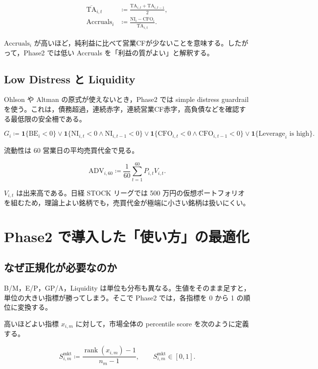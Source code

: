 \documentclass[a4paper,10pt]{article}
\newcommand{\BE}{\mathrm{BE}}
\newcommand{\NI}{\mathrm{NI}}
\newcommand{\CFO}{\mathrm{CFO}}
\newcommand{\TA}{\mathrm{TA}}
\newcommand{\ADV}{\mathrm{ADV}}
\newcommand{\Acc}{\mathrm{Accruals}}
\newcommand{\rank}{\operatorname{rank}}
\newcommand{\1}{\mathbf{1}}
\begin{document}
\begin{align}
\overline{\TA}_{i,t} &\coloneqq \frac{\TA_{i,t}+\TA_{i,t-1}}{2}, \label{eq:avgta}\\
\Acc_i &\coloneqq \frac{\NI_i-\CFO_i}{\overline{\TA}_{i,t}}. \label{eq:accruals}
\end{align}

$\Acc_i$ が高いほど，純利益に比べて営業CFが少ないことを意味する。したがって，Phase2 では低い Accruals を「利益の質がよい」と解釈する。

\subsection{Low Distress と Liquidity}
Ohlson や Altman の原式が使えないとき，Phase2 では simple distress guardrail を使う。これは，債務超過，連続赤字，連続営業CF赤字，高負債などを確認する最低限の安全柵である。

\begin{equation}
G_i \coloneqq \1\{\BE_i<0\}\lor \1\{\NI_{i,t}<0\land \NI_{i,t-1}<0\}\lor \1\{\CFO_{i,t}<0\land \CFO_{i,t-1}<0\}\lor \1\{\mathrm{Leverage}_i \text{ is high}\} .
\label{eq:guardrail}
\end{equation}

流動性は 60 営業日の平均売買代金で見る。

\begin{equation}
\ADV_{i,60} \coloneqq \frac{1}{60}\sum_{t=1}^{60} P_{i,t}V_{i,t} .
\label{eq:adv}
\end{equation}

$V_{i,t}$ は出来高である。日経 STOCK リーグでは 500 万円の仮想ポートフォリオを組むため，理論上よい銘柄でも，売買代金が極端に小さい銘柄は扱いにくい。

\section{Phase2 で導入した「使い方」の最適化}

\subsection{なぜ正規化が必要なのか}
B/M，E/P，GP/A，Liquidity は単位も分布も異なる。生値をそのまま足すと，単位の大きい指標が勝ってしまう。そこで Phase2 では，各指標を 0 から 1 の順位に変換する。

高いほどよい指標 $x_{i,m}$ に対して，市場全体の percentile score を次のように定義する。

\begin{equation}
S_{i,m}^{\mathrm{mkt}} \coloneqq \frac{\rank(x_{i,m})-1}{n_m-1}, \qquad S_{i,m}^{\mathrm{mkt}}\in[0,1].
\label{eq:market-percentile}
\end{equation}
\end{document}
